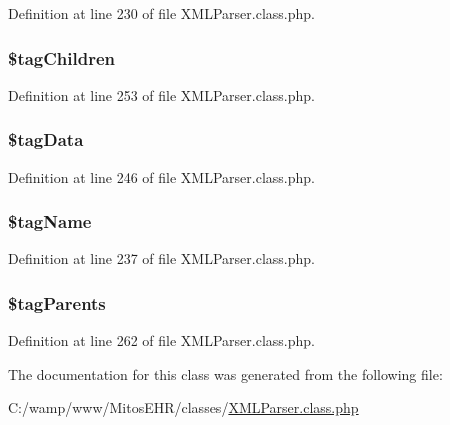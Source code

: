 \-Definition at line 230 of file \-X\-M\-L\-Parser.\-class.\-php.

\hypertarget{class_x_m_l_tag_a2821a1ccb28feedeb1090436a5f83480}{
\subsubsection[{\$tag\-Children}]{\setlength{\rightskip}{0pt plus 5cm}\$tag\-Children}}\label{class_x_m_l_tag_a2821a1ccb28feedeb1090436a5f83480}


\-Definition at line 253 of file \-X\-M\-L\-Parser.\-class.\-php.

\hypertarget{class_x_m_l_tag_a54d28f1823b6ebc04b6aac2b4a006047}{
\subsubsection[{\$tag\-Data}]{\setlength{\rightskip}{0pt plus 5cm}\$tag\-Data}}\label{class_x_m_l_tag_a54d28f1823b6ebc04b6aac2b4a006047}


\-Definition at line 246 of file \-X\-M\-L\-Parser.\-class.\-php.

\hypertarget{class_x_m_l_tag_a526eef5c35551ca57b86d20034360d16}{
\subsubsection[{\$tag\-Name}]{\setlength{\rightskip}{0pt plus 5cm}\$tag\-Name}}\label{class_x_m_l_tag_a526eef5c35551ca57b86d20034360d16}


\-Definition at line 237 of file \-X\-M\-L\-Parser.\-class.\-php.

\hypertarget{class_x_m_l_tag_a057b424591d6238416f982c4ab8f8386}{
\subsubsection[{\$tag\-Parents}]{\setlength{\rightskip}{0pt plus 5cm}\$tag\-Parents}}\label{class_x_m_l_tag_a057b424591d6238416f982c4ab8f8386}


\-Definition at line 262 of file \-X\-M\-L\-Parser.\-class.\-php.



\-The documentation for this class was generated from the following file\-:\begin{DoxyCompactItemize}
\item 
\-C\-:/wamp/www/\-Mitos\-E\-H\-R/classes/\hyperlink{_x_m_l_parser_8class_8php}{\-X\-M\-L\-Parser.\-class.\-php}\end{DoxyCompactItemize}
